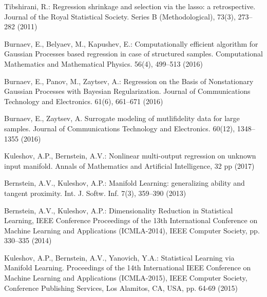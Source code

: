 \documentclass[conference]{IEEEtran} %
\begin{document}
\begin{thebibliography}{100}
Tibshirani, R.: Regression shrinkage and selection via the lasso: a retrospective. Journal of the Royal Statistical Society. Series B (Methodological), 73(3), 273--282 (2011)

Burnaev, E., Belyaev, M., Kapushev, E.: Computationally efficient algorithm for Gaussian Processes based regression in case of structured samples. Computational Mathematics and Mathematical Physics. 56(4), 499--513 (2016)

Burnaev, E., Panov, M., Zaytsev, A.: Regression on the Basis of Nonstationary Gaussian Processes with Bayesian Regularization. Journal of Communications Technology and Electronics. 61(6), 661--671 (2016)

Burnaev, E., Zaytsev, A. Surrogate modeling of mutlifidelity data for large samples. Journal of Communications Technology and Electronics. 60(12), 1348--1355 (2016)

Kuleshov, A.P., Bernstein, A.V.: Nonlinear multi-output regression on unknown input manifold. Annals of Mathematics and Artificial Intelligence, 32 pp (2017)

Bernstein, A.V., Kuleshov, A.P.: Manifold Learning: generalizing ability and tangent proximity. Int. J. Softw. Inf. 7(3), 359--390 (2013)

Bernstein, A.V., Kuleshov, A.P.: Dimensionality Reduction in Statistical Learning, IEEE Conference Proceedings of the 13th International Conference on Machine Learning and Applications (ICMLA-2014), IEEE Computer Society, pp. 330–335 (2014)

Kuleshov, A.P., Bernstein, A.V., Yanovich, Y.A.: Statistical Learning via Manifold Learning. Proceedings of the 14th International IEEE Conference on Machine Learning and Applications (ICMLA-2015), IEEE Computer Society, Conference Publishing Services, Los Alamitos, CA, USA, pp. 64-69 (2015)


\end{thebibliography}
\end{document}

